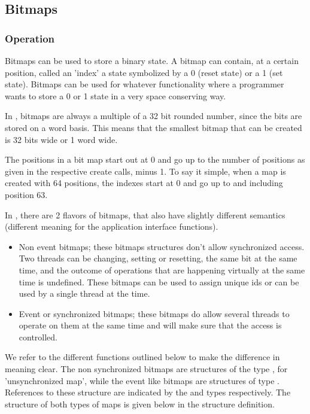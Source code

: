 %
%

\subsection{Bitmaps}

\subsubsection{Operation}

Bitmaps can be used to store a binary state. A bitmap can contain, at a
certain position, called an 'index' a state symbolized by a 0 (reset state)
or a 1 (set state). Bitmaps can be used for whatever functionality where a
programmer wants to store a 0 or 1 state in a very space conserving way.

In \oswald, bitmaps are always a multiple of a 32 bit rounded number, since
the bits are stored on a word basis. This means that the smallest bitmap that
can be created is 32 bits wide or 1 word wide.

The positions in a bit map start out at 0 and go up to the number of
positions as given in the respective create calls, minus 1. To say it
simple, when a map is created with 64 positions, the indexes start at 0 and
go up to and including position 63.

In \oswald, there are 2 flavors of bitmaps, that also have slightly
different semantics (different meaning for the application interface
functions).

\begin{itemize}
\item Non event bitmaps; these bitmaps structures don't allow synchronized
access. Two threads can be changing, setting or resetting, the same bit at
the same time, and the outcome of operations that are happening virtually at
the same time is undefined. These bitmaps can be used to assign unique ids
or can be used by a single thread at the time.
\item Event or synchronized bitmaps; these bitmaps do allow several threads
to operate on them at the same time and \oswald will make sure that the
access is controlled.
\end{itemize}

We refer to the different functions outlined below to make the difference in
meaning clear. The non synchronized bitmaps are structures of the type
, for 'unsynchronized map', while the event like bitmaps are
structures of type . References to these structure are
indicated by the  and  types respectively.
The structure of both types of maps is given below in the structure
definition.

